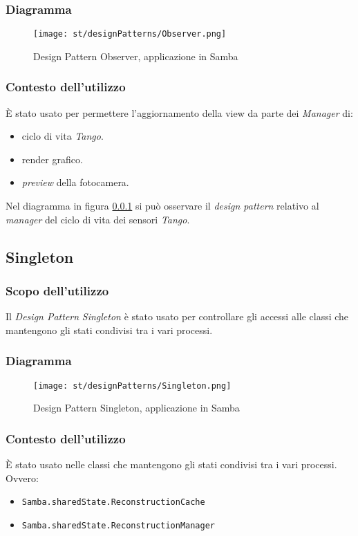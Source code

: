 \subsubsection{Diagramma}\label{dia:ObserverPattern}
\begin{figure}[H] 
    \centering 
    \texttt{[image: st/designPatterns/Observer.png]} 
    \caption{Design Pattern Observer, applicazione in Samba}
\end{figure}
\subsubsection{Contesto dell'utilizzo}
È stato usato per permettere l'aggiornamento della view da parte dei \emph{Manager} di:
\begin{itemize}
	\item ciclo di vita \emph{Tango}.
	\item render grafico.
	\item \emph{preview} della fotocamera.
\end{itemize}
Nel diagramma in figura \ref{dia:ObserverPattern} si può osservare il \emph{design pattern} relativo al \emph{manager} del ciclo di vita dei sensori \emph{Tango}.

\subsection{Singleton}
\subsubsection{Scopo dell'utilizzo}
Il \emph{Design Pattern} \emph{Singleton} è stato usato per controllare gli accessi alle classi che mantengono gli stati condivisi tra i vari processi. 
\subsubsection{Diagramma}
\begin{figure}[H] 
    \centering 
    \texttt{[image: st/designPatterns/Singleton.png]} 
    \caption{Design Pattern Singleton, applicazione in Samba}
\end{figure}
\subsubsection{Contesto dell'utilizzo}
È stato usato nelle classi che mantengono gli stati condivisi tra i vari processi. Ovvero:
\begin{itemize}
	\item \texttt{Samba.sharedState.ReconstructionCache}
	\item \texttt{Samba.sharedState.ReconstructionManager}	
\end{itemize}




















